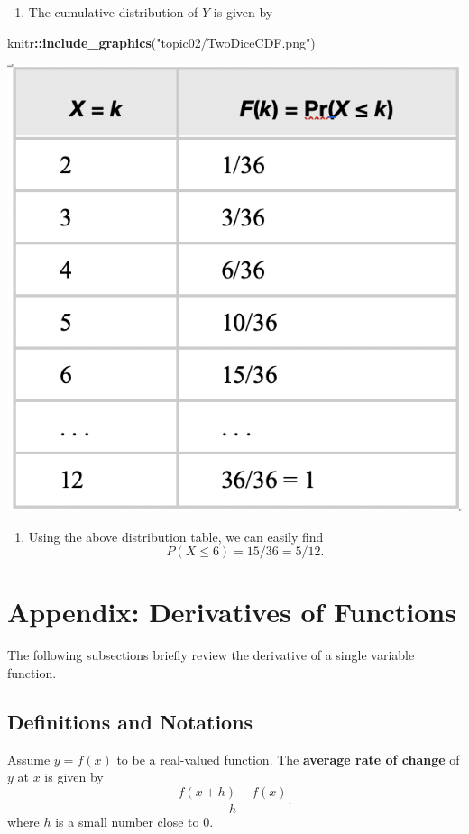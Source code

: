 \documentclass[
]{book}
\newenvironment{Shaded}{\begin{snugshade}}{\end{snugshade}}
\newcommand{\FunctionTok}[1]{\textcolor[rgb]{0.13,0.29,0.53}{\textbf{#1}}}
\newcommand{\NormalTok}[1]{#1}
\newcommand{\SpecialCharTok}[1]{\textcolor[rgb]{0.81,0.36,0.00}{\textbf{#1}}}
\newcommand{\StringTok}[1]{\textcolor[rgb]{0.31,0.60,0.02}{#1}}
\providecommand{\tightlist}{%
  \setlength{\itemsep}{0pt}\setlength{\parskip}{0pt}}
\begin{document}
\begin{enumerate}
\def\labelenumi{\arabic{enumi}.}
\setcounter{enumi}{2}
\tightlist
\item
  The cumulative distribution of \(Y\) is given by
\end{enumerate}

\begin{Shaded}
\begin{Highlighting}[]
\NormalTok{knitr}\SpecialCharTok{::}\FunctionTok{include\_graphics}\NormalTok{(}\StringTok{"topic02/TwoDiceCDF.png"}\NormalTok{)}
\end{Highlighting}
\end{Shaded}

\begin{center}\includegraphics[width=0.28\linewidth]{topic02/TwoDiceCDF} \end{center}

\begin{enumerate}
\def\labelenumi{\arabic{enumi}.}
\setcounter{enumi}{3}
\tightlist
\item
  Using the above distribution table, we can easily find
  \[
  P(X \le 6) = 15/36 = 5/12.
  \]
\end{enumerate}

\hfill\break

\hypertarget{appendix-derivatives-of-functions}{%
\section{Appendix: Derivatives of Functions}\label{appendix-derivatives-of-functions}}

The following subsections briefly review the derivative of a single variable function.

\hypertarget{definitions-and-notations}{%
\subsection{Definitions and Notations}\label{definitions-and-notations}}

Assume \(y = f(x)\) to be a real-valued function. The \textbf{average rate of change} of \(y\) at \(x\) is given by
\[
\frac{f(x+h) - f(x)}{h}.
\]
where \(h\) is a small number close to 0.
\end{document}
